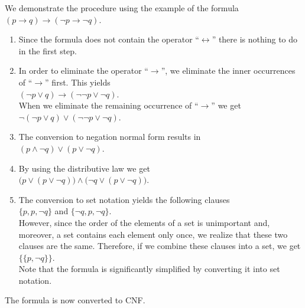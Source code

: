 We demonstrate the procedure using the example of the formula\\[0.2cm]
\hspace*{1.3cm} $(p \rightarrow q) \rightarrow (\neg p \rightarrow \neg q)$.
\begin{enumerate}
\item Since the formula does not contain the operator ``$\leftrightarrow$''
      there is nothing to do in the first step.
\item In order to eliminate the operator ``$\rightarrow$'', we eliminate the inner occurrences of
      ``$\rightarrow$'' first.  This yields
      \\[0.2cm]
      \hspace*{1.3cm} $(\neg p \vee q) \rightarrow (\neg \neg p \vee \neg q)$.
      \\[0.2cm]
      When we eliminate the remaining occurrence of ``$\rightarrow$''  we get
      \\[0.2cm]
      \hspace*{1.3cm} $\neg (\neg p \vee q) \vee (\neg \neg p \vee \neg q)$.
\item The conversion to negation normal form results in \\[0.2cm]
      \hspace*{1.3cm} $(p \wedge \neg q) \vee (p \vee \neg q)$.
\item By using the distributive law we get \\[0.2cm]
      \hspace*{1.3cm} $\bigl(p \vee (p \vee \neg q)\bigr) \wedge \bigl(\neg q \vee (p \vee \neg q)\bigr)$.
\item The conversion to set notation yields the following clauses \\[0.2cm] 
      \hspace*{1.3cm} $\{p, p, \neg q\}$ \quad and \quad $\{\neg q, p, \neg q\}$. \\[0.2cm]
      However, since the order of the elements of a set is unimportant and, moreover, a set
      contains each element only once, we realize that these two clauses are the same.
      Therefore, if we combine these clauses into a set, we get \\[0.2cm]
      \hspace*{1.3cm} $\bigl\{ \{p, \neg q\} \bigr\}$. \\[0.2cm]
      Note that the formula is significantly simplified by converting it into set
      notation.
\end{enumerate}
The formula is now converted to CNF.


